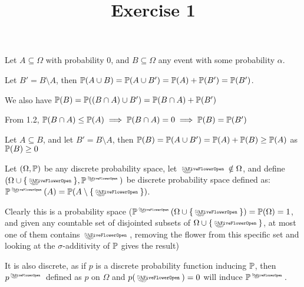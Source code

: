 

\usepackage{skak}
\usepackage{relsize}
\usepackage{graphicx}
\usepackage{mathtools}

\usepackage{textcomp}
\usepackage{bbding}

\usepackage{soul}

\newcommand{\flower}{\text{\scalebox{0.75}{\raisebox{-0.7ex}{
				\rotatebox{90}{\textleaf}\hspace{-0.3em}
				\scalebox{0.7}{\textleaf}\hspace{-1.35em}
				\raisebox{1ex}{\scalebox{0.8}{\FiveFlowerOpen}}
}}}}
\title{Exercise 1}

\maketitle
\begin{cExercise}
	\begin{cPart}
		
		Let $A\subseteq \Omega$ with probability $0$, and $B\subseteq \Omega$ any event with some probability $\alpha$.
		
		Let $B'=B\setminus A$, then $\P(A\cup B)=\P(A\cup B')=\P(A)+\P(B')=\P(B')$.
		
		We also have $\P(B)=\P((B\cap A)\cup B')=\P(B\cap A)+\P(B')$
		
		From 1.2, $\P(B\cap A)\le\P(A)\implies \P(B\cap A)=0\implies \P(B)=\P(B')$
		
	\end{cPart}
	\begin{cPart}
		Let $A\subseteq B$, and let $B'=B\setminus A$, then $\P(B)=\P(A\cup B')=\P(A)+\P(B)\ge \P(A)$ as $\P(B)\ge 0$
		
	\end{cPart}
	\begin{cPart}
		Let $(\Omega, \P)$ be any discrete probability space, let $\flower\notin \Omega$, and define $(\Omega\cup\{\flower\}, \P^{\flower})$ be discrete probability space defined as: $\P^{\flower}(A)=\P(A\setminus\{\flower\})$.
		
		Clearly this is a probability space ($\P^{\flower}(\Omega\cup\{\flower\})=\P(\Omega)=1$, and given any countable set of disjointed subsets of $\Omega\cup\{\flower\}$, at most one of them contains $\flower$, removing the flower from this specific set and looking at the $\sigma$-additivity of $\P$ gives the result)
		
		It is also discrete, as if $p$ is a discrete probability function inducing $\P$, then $p^{\flower}$ defined as $p$ on $\Omega$ and $p(\flower)=0$ will induce $\P^{\flower}$.
		

\end{cPart}
\end{cExercise}
